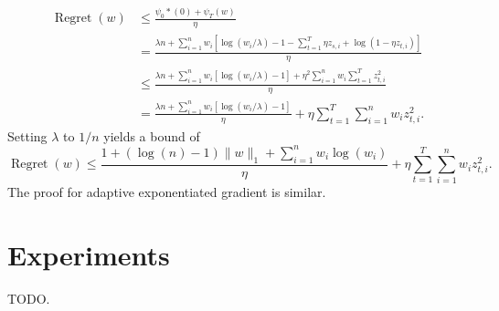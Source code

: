 \documentclass[11pt]{article}
\DeclareMathOperator{\Regret}{Regret}
\begin{document}
\begin{align}
        \Regret(w) &\leq \frac{\psi_0*(0) + \psi_T(w)}{\eta} \\
                   &= \frac{\lambda n + \sum_{i=1}^n w_i[\log(w_i/\lambda)-1-\sum_{t=1}^T \eta z_{s,i} + \log(1 - \eta z_{t,i})]}{\eta} \\
                   &\leq \frac{\lambda n + \sum_{i=1}^n w_i[\log(w_i/\lambda)-1] + \eta^2 \sum_{i=1}^n w_i \sum_{t=1}^T z_{t,i}^2}{\eta} \\
                   &= \frac{\lambda n + \sum_{i=1}^n w_i[\log(w_i/\lambda)-1]}{\eta} + \eta \sum_{t=1}^T \sum_{i=1}^n w_i z_{t,i}^2.
\end{align}
Setting $\lambda$ to $1/n$ yields a bound of
\[ \Regret(w) \leq \frac{1+(\log(n)-1)\|w\|_1 + \sum_{i=1}^n w_i\log(w_i)}{\eta} + \eta \sum_{t=1}^T \sum_{i=1}^n w_i z_{t,i}^2. \]
The proof for adaptive exponentiated gradient is similar.
\section{Experiments}
TODO.


\end{document}
